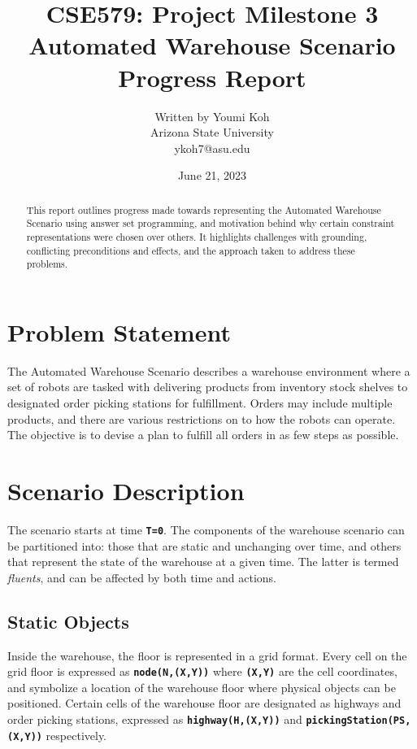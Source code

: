 \documentclass[letterpaper]{article}
\title{
    CSE579: Project Milestone 3\\
    Automated Warehouse Scenario\\
    Progress Report}
\author{
    Written by Youmi Koh \\
    Arizona State University \\
    ykoh7@asu.edu
}
\date{June 21, 2023}
\newcommand{\ct}[1]{\texttt{\textbf{#1}}}
\begin{document}
\maketitle


\begin{abstract}
This report outlines progress made towards representing the Automated Warehouse Scenario using answer set programming, and motivation behind why certain constraint representations were chosen over others. It highlights challenges with grounding, conflicting preconditions and effects, and the approach taken to address these problems.
\end{abstract}

\section{Problem Statement}

\noindent The Automated Warehouse Scenario describes a warehouse environment where a set of robots are tasked with delivering products from inventory stock shelves to designated order picking stations for fulfillment. Orders may include multiple products, and there are various restrictions on to how the robots can operate. The objective is to devise a plan to fulfill all orders in as few steps as possible.

\section{Scenario Description}

The scenario starts at time \ct{T=0}. The components of the warehouse scenario can be partitioned into: those that are static and unchanging over time, and others that represent the state of the warehouse at a given time. The latter is termed \emph{fluents}, and can be affected by both time and actions.

\subsection{Static Objects}

Inside the warehouse, the floor is represented in a grid format. Every cell on the grid floor is expressed as \ct{node(N,(X,Y))} where \ct{(X,Y)} are the cell coordinates, and symbolize a location of the warehouse floor where physical objects can be positioned. Certain cells of the warehouse floor are designated as highways and order picking stations, expressed as \ct{highway(H,(X,Y))} and \ct{pickingStation(PS,(X,Y))} respectively.
\end{document}
